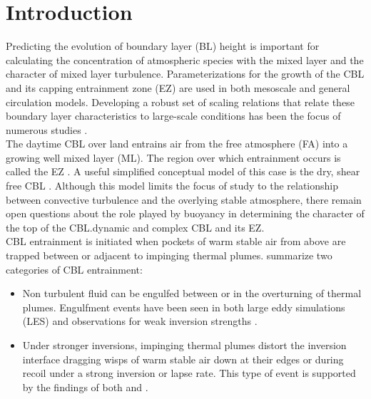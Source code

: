 \documentclass[referee]{svjour3}
\begin{document}
\section{Introduction}
\label{intro}


Predicting the evolution of boundary layer (BL) height is important for calculating the concentration of atmospheric species with the mixed layer and the character of mixed layer turbulence.  Parameterizations for the growth of the  CBL and its capping entrainment zone (EZ) are used in both mesoscale and general circulation models.  Developing a robust set of scaling relations that relate these boundary layer characteristics to large-scale conditions has been the focus of numerous studies
 \citep[e.g.][]{Stull-BLMetIntro, Traum11, SteynBaldHoff, StullNelEl, Sorbjan1}.\\

The daytime CBL over land entrains air from the free atmosphere (FA) into a growing well mixed layer (ML).  The region over which entrainment occurs is called the EZ \citep{DearWill80}. A useful simplified conceptual model of this case is the dry, shear free CBL \citep{SullMoengStev, FedConzMir04, BrooksFowler2}. Although this model limits the focus of study to the relationship between convective turbulence and the overlying stable atmosphere, there remain open questions about the role played by buoyancy in determining the character of the top of the CBL.dynamic and complex CBL and its EZ.\\  

CBL entrainment is initiated when pockets of warm stable air from above are trapped between or adjacent to impinging thermal plumes.  \citep{Traum11} summarize two categories of CBL entrainment:\\

\begin{itemize}

\item{Non turbulent fluid can be engulfed between or in the overturning of thermal plumes. Engulfment events have been seen in both   large eddy simulations (LES) and observations for weak inversion strengths \citep{SullMoengStev,Traum11}.}  

\item{
Under stronger inversions, impinging thermal plumes distort the inversion interface dragging wisps of warm stable air down at their edges or during recoil under a strong inversion or lapse rate. This type of event is supported by the findings  of both \cite{SullMoengStev} and \cite{Traum11}.}

\end{itemize}
\end{document}
